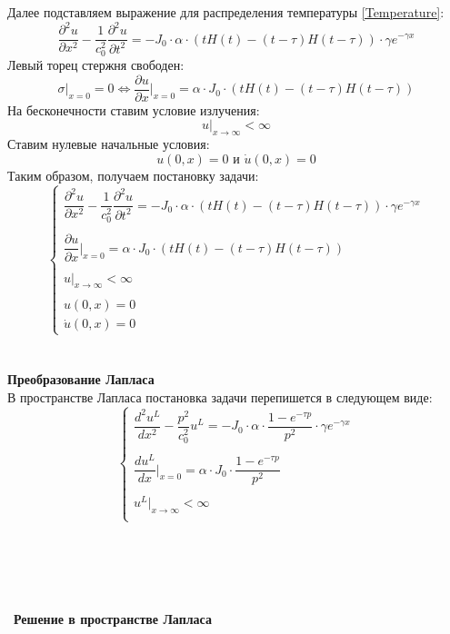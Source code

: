 \documentclass[a4paper, 11pt]{article}
\newcommand{\beq}{\begin{equation}}
\newcommand{\eeq}{\end{equation}}
\newenvironment{solution}
    {\textit{}}
    {}
\begin{document}
\begin{solution}
Далее подставляем выражение для распределения температуры \eqref{Temperature}:
\beq
\frac{\partial^2u}{\partial x^2}-\frac{1}{c_0^2}\frac{\partial^2u}{\partial t^2}=-J_0\cdot\alpha\cdot\left(tH(t)-(t-\tau)H(t-\tau)\right)\cdot\gamma e^{-\gamma x}
\eeq
Левый торец стержня свободен:
\beq
\sigma|_{x=0}=0\Leftrightarrow\frac{\partial u}{\partial x}\bigg|_{x=0}=\alpha\cdot J_0\cdot\left(tH(t)-(t-\tau)H(t-\tau)\right)
\eeq
На бесконечности ставим условие излучения:
\beq
u|_{x\rightarrow\infty}<\infty
\eeq
Ставим нулевые начальные условия:
\beq
u(0,x)=0\text{ и }\dot{u}(0,x)=0
\eeq
Таким образом, получаем постановку задачи:
\beq
\begin{cases}
	\dfrac{\partial^2u}{\partial x^2}-\dfrac{1}{c_0^2}\dfrac{\partial^2u}{\partial t^2}=-J_0\cdot\alpha\cdot\left(tH(t)-(t-\tau)H(t-\tau)\right)\cdot\gamma e^{-\gamma x}\\\\
	\dfrac{\partial u}{\partial x}\bigg|_{x=0}=\alpha\cdot J_0\cdot\left(tH(t)-(t-\tau)H(t-\tau)\right)\\\\
	u|_{x\rightarrow\infty}<\infty\\\\
	u(0,x)=0\\
	\dot{u}(0,x)=0
\end{cases}
\eeq
\\\\
\textbf{Преобразование Лапласа}\\

В пространстве Лапласа постановка задачи перепишется в следующем виде:
\beq
\begin{cases}
\dfrac{d^2u^L}{dx^2}-\dfrac{p^2}{c_0^2}u^L=-J_0\cdot\alpha\cdot\dfrac{1-e^{-\tau p}}{p^2}\cdot \gamma e^{-\gamma x}\\\\
\dfrac{du^L}{dx}\bigg|_{x=0}=\alpha\cdot J_0\cdot\dfrac{1-e^{-\tau p}}{p^2}\\\\
u^L|_{x\rightarrow\infty}<\infty\\
\end{cases}
\eeq
\\\\\\\\\\\
\textbf{Решение в пространстве Лапласа}\\


\end{solution}
\end{document}
